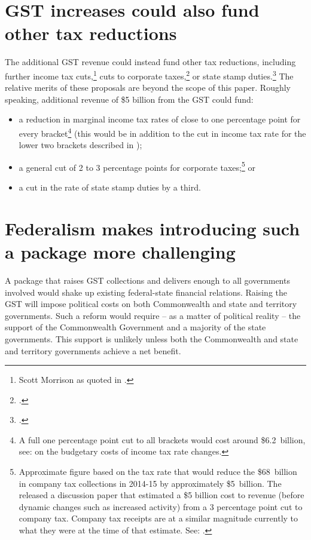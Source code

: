 \documentclass{grattanAlpha}
\begin{document}
\section{GST increases could also fund other tax reductions}\label{sec:GST-4-3}
The additional GST revenue could instead fund other tax reductions, including further income tax cuts,\footnote{Scott Morrison as quoted in \textcite{Coorey2015a}.}  cuts to corporate taxes,\footcite{FinancialServicesCouncil2015-Tax-white-paper-submission}  or state stamp duties.\footcite{PropertyCouncil2015-Tax-reform}  The relative merits of these proposals are beyond the scope of this paper. Roughly speaking, additional revenue of \$5 billion from the GST could fund:
\begin{itemize}
\item	a reduction in marginal income tax rates of close to one percentage point for every bracket\footnote{A full one percentage point cut to all brackets would cost around \$6.2~billion, see:  on the budgetary costs of income tax rate changes.}  (this would be in addition to the cut in income tax rate for the lower two brackets described in ); 
\item 	a general cut of 2 to 3 percentage points for corporate taxes;\footnote{Approximate figure based on the tax rate that would reduce the \$68~billion in company tax collections in 2014-15 by approximately \$5~billion. The \textcite{BusinessTaxWorkingGroup2012} released a discussion paper that estimated a \$5 billion cost to revenue (before dynamic changes such as increased activity) from a 3 percentage point cut to company tax. Company tax receipts are at a similar magnitude currently to what they were at the time of that estimate. See: \textcite[][Statement~4]{Treasury2015BudgetPapers201516}.}  or
\item 	a cut in the rate of state stamp duties by a third.
\end{itemize}
\section{Federalism makes introducing such a package more challenging\label{sec:GST-4-4}}
A package that raises GST collections and delivers enough to all governments involved would shake up existing federal-state financial relations. 
Raising the GST will impose political costs on both Commonwealth and state and territory governments. Such a reform would require – as a matter of political reality – the support of the Commonwealth Government and a majority of the state governments. This support is unlikely unless both the Commonwealth and state and territory governments achieve a net benefit. 
\end{document}
